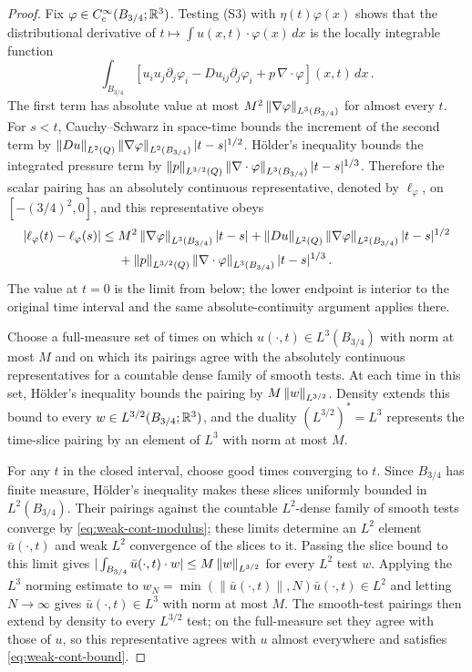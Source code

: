 \documentclass[11pt,letterpaper]{article}
\numberwithin{equation}{section}
\theoremstyle{plain}
\theoremstyle{definition}
\theoremstyle{remark}
\begin{document}
\begin{proof}
Fix $\varphi\in C_c^\infty(B_{3/4};\mathbb{R}^3)$. Testing (S3) with $\eta(t)\varphi(x)$ shows that the distributional derivative of $t\mapsto\int u(x,t)\cdot\varphi(x)\,dx$ is the locally integrable function
\begin{equation}\label{eq:weak-cont-derivative}
\int_{B_{3/4}}\left[u_i u_j\partial_j\varphi_i
 -Du_{ij}\partial_j\varphi_i+p\,\nabla\cdot\varphi\right](x,t)\,dx\,.
\end{equation}
The first term has absolute value at most $M^2\left\lVert \nabla\varphi\right\rVert_{L^3(B_{3/4})}$ for almost every $t$. For $s<t$, Cauchy--Schwarz in space-time bounds the increment of the second term by $\left\lVert Du\right\rVert_{L^2(Q)}\left\lVert \nabla\varphi\right\rVert_{L^2(B_{3/4})}|t-s|^{1/2}$. H\"older's inequality bounds the integrated pressure term by $\left\lVert p\right\rVert_{L^{3/2}(Q)}\left\lVert \nabla\cdot\varphi\right\rVert_{L^3(B_{3/4})}|t-s|^{1/3}$. Therefore the scalar pairing has an absolutely continuous representative, denoted by $\ell_\varphi$, on $[-(3/4)^2,0]$, and this representative obeys
\begin{align}\label{eq:weak-cont-modulus}
\left\lvert \ell_\varphi(t)-\ell_\varphi(s)\right\rvert
\le{}&M^2\left\lVert \nabla\varphi\right\rVert_{L^3(B_{3/4})}|t-s|
 +\left\lVert Du\right\rVert_{L^2(Q)}\left\lVert \nabla\varphi\right\rVert_{L^2(B_{3/4})}|t-s|^{1/2}\notag\\
&+\left\lVert p\right\rVert_{L^{3/2}(Q)}\left\lVert \nabla\cdot\varphi\right\rVert_{L^3(B_{3/4})}|t-s|^{1/3}\,.
\end{align}
The value at $t=0$ is the limit from below; the lower endpoint is interior to the original time interval and the same absolute-continuity argument applies there.

Choose a full-measure set of times on which $u(\cdot,t)\in L^3(B_{3/4})$ with norm at most $M$ and on which its pairings agree with the absolutely continuous representatives for a countable dense family of smooth tests. At each time in this set, Hölder's inequality bounds the pairing by $M\left\lVert w\right\rVert_{L^{3/2}}$. Density extends this bound to every $w\in L^{3/2}(B_{3/4};\mathbb{R}^3)$, and the duality $(L^{3/2})^*=L^3$ represents the time-slice pairing by an element of $L^3$ with norm at most $M$.

For any $t$ in the closed interval, choose good times converging to $t$. Since $B_{3/4}$ has finite measure, H\"older's inequality makes these slices uniformly bounded in $L^2(B_{3/4})$. Their pairings against the countable $L^2$-dense family of smooth tests converge by \eqref{eq:weak-cont-modulus}; these limits determine an $L^2$ element $\bar u(\cdot,t)$ and weak $L^2$ convergence of the slices to it. Passing the slice bound to this limit gives $|\int_{B_{3/4}}\bar u(\cdot,t)\cdot w|\le M\left\lVert w\right\rVert_{L^{3/2}}$ for every $L^2$ test $w$. Applying the $L^3$ norming estimate to $w_N=\min(\|\bar u(\cdot,t)\|,N)\bar u(\cdot,t)\in L^2$ and letting $N\to\infty$ gives $\bar u(\cdot,t)\in L^3$ with norm at most $M$. The smooth-test pairings then extend by density to every $L^{3/2}$ test; on the full-measure set they agree with those of $u$, so this representative agrees with $u$ almost everywhere and satisfies \eqref{eq:weak-cont-bound}.
\end{proof}
\end{document}
